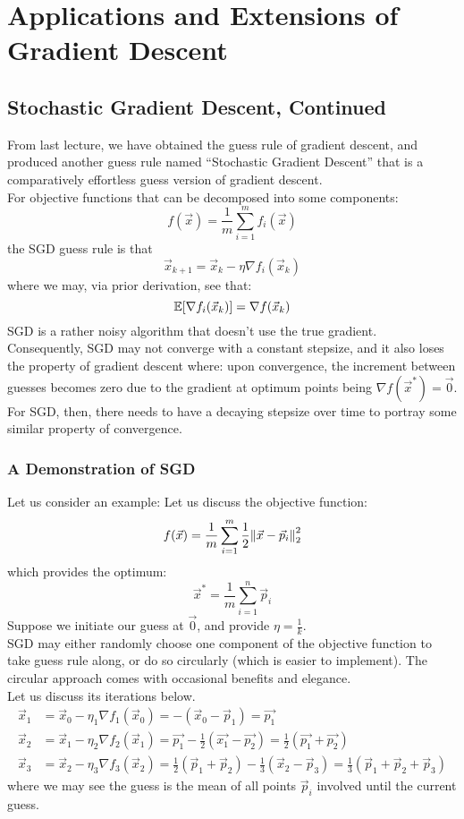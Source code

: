 \chapter{Applications and Extensions of Gradient Descent}

\section{Stochastic Gradient Descent, Continued}
From last lecture, we have obtained the guess rule of gradient descent, and produced another guess rule named ``Stochastic Gradient Descent'' that is a comparatively effortless guess version of gradient descent. \\
For objective functions that can be decomposed into some components:
\[
    f(\vec{x}) = \frac{1}{m} \sum_{i = 1}^m f_i (\vec{x})
\]
the SGD guess rule is that
\[
    \vec{x}_{k + 1} = \vec{x}_k - \eta \nabla f_i (\vec{x}_k)
\]
where we may, via prior derivation, see that:
\[
    \E[\nabla f_i (\vec{x}_k)] = \nabla f(\vec{x}_k)
\]
SGD is a rather noisy algorithm that doesn't use the true gradient. \\
Consequently, SGD may not converge with a constant stepsize, and it also loses the property of gradient descent where: upon convergence, the increment between guesses becomes zero due to the gradient at optimum points being $\nabla f(\vec{x}^*) = \vec{0}$.
For SGD, then, there needs to have a decaying stepsize over time to portray some similar property of convergence.

\subsection{A Demonstration of SGD}
Let us consider an example:
    Let us discuss the objective function:
\[
    f(\vec{x}) = \frac{1}{m} \sum_{i = 1}^m \frac{1}{2} \pnorm[2]{\vec{x} - \vec{p}_i}{2}
\]
which provides the optimum:
\[
    \vec{x}^* = \frac{1}{m} \sum_{i = 1}^n \vec{p}_i
\]
Suppose we initiate our guess at $\vec{0}$, and provide $\eta = \frac{1}{k}$. \\
SGD may either randomly choose one component of the objective function to take guess rule along, or do so circularly (which is easier to implement).
The circular approach comes with occasional benefits and elegance. \\
Let us discuss its iterations below.
\begin{align*}
    \vec{x}_1
    &= \vec{x}_0 - \eta_1 \nabla f_1 (\vec{x}_0)
    = - (\vec{x}_0 - \vec{p}_1) = \vec{p_1} \\
    \vec{x}_2
    &= \vec{x}_1 - \eta_2 \nabla f_2 (\vec{x}_1)
    = \vec{p_1} - \frac{1}{2} (\vec{x_1} - \vec{p_2}) = \frac{1}{2} (\vec{p_1} + \vec{p_2}) \\
    \vec{x}_3
    &= \vec{x}_2 - \eta_3 \nabla f_3 (\vec{x}_2)
    = \frac{1}{2} (\vec{p}_1 + \vec{p}_2) - \frac{1}{3} (\vec{x}_2 - \vec{p}_3) = \frac{1}{3} (\vec{p}_1 + \vec{p}_2 + \vec{p}_3)
\end{align*}
where we may see the guess is the mean of all points $\vec{p}_i$ involved until the current guess.

